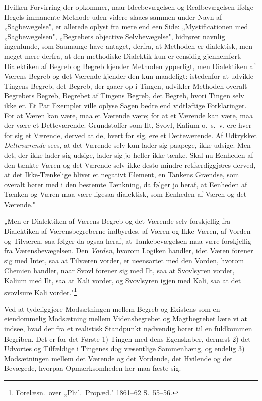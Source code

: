 \documentclass[12pt]{book}
\newcommand{\opage}[1]{\marginnote{\footnotesize\textit{[#1]}}}
\begin{document}
Hvilken Forvirring der opkommer, naar Ideebevægelsen og Realbevægelsen ifølge Hegels immanente
Methode uden videre slaaes sammen under Navn af „Sagbevægelse", er allerede oplyst fra mere end
een Side: „Mystificationen med „Sagbevægelsen", „Begrebets objective Selvbevægelse", hidrører
navnlig ingenlunde, som Saamange have antaget, derfra, at Methoden er dialektisk, men meget mere
derfra, at den methodiske Dialektik kun er eensidig gjennemført. Dialektiken af Begreb og Begreb
kjender Methoden ypperligt, men Dialektiken af Værens Begreb og det Værende kjender den kun
maadeligt: istedenfor at udvikle Tingens Begreb, det Begreb, der gaaer op i Tingen, udvikler
Methoden overalt Begrebets Begreb, Begrebet af Tingens Begreb, det Begreb, hvori Tingen selv ikke
er. Et Par Exempler ville oplyse Sagen bedre end vidtløftige Forklaringer. For at Væren kan være,
maa et Værende være; for at et Værende kan være, maa der være et Detteværende. Grundstoffer som
Ilt, Svovl, Kalium o.\ s.\ v. ere hver for sig et Værende, derved at de, hvert for sig, ere et
Detteværende. Af Udtrykket \emph{Detteværende} sees, at det Værende selv kun lader sig paapege,
ikke udsige. Men det, der ikke lader sig udsige, lader sig jo heller ikke tænke. Skal nu Eenheden
af den tænkte Væren og det Værende selv
\opage{201} ikke desto mindre retfærdiggjøres derved, at det Ikke-Tænkelige bliver et negativt Element, en
Tankens Grændse, som overalt hører med i den bestemte Tænkning, da følger jo heraf, at Eenheden af
Tænken og Væren maa være ligesaa dialektisk, som Eenheden af Væren og det Værende."

„Men er Dialektiken af Værens Begreb og det Værende selv forskjellig fra Dialektiken af
Værensbegreberne indbyrdes, af Væren og Ikke-Væren, af Vorden og Tilværen, saa følger da ogsaa
heraf, at Tankebevægelsen maa være forskjellig fra Værensbevægelsen. Den \emph{Vorden}, hvorom
Logiken handler, idet Væren forener sig med Intet, saa at Tilværen vorder, er ueensartet med den
Vorden, hvorom Chemien handler, naar Svovl forener sig med Ilt, saa at Svovlsyren vorder, Kalium
med Ilt, saa at Kali vorder, og Svovlsyren igjen med Kali, saa at det svovlsure Kali
vorder."\footnote{Forelæsn.\ over „Phil.\ Propæd." 1861--62 S.~55--56.}

Ved at tydeliggjøre Modsætningen mellem Begreb og Existens som en eiendommelig Modsætning mellem
Vidensbegrebet og Magtbegrebet lære vi at indsee, hvad der fra et realistisk Standpunkt nødvendig
hører til en fuldkommen Begriben. Det er for det Første 1) Tingen med dens Egenskaber, dernæst 2)
det Udvortes og Tilfældige i Tingenes dog væsentlige Sammenhæng, og endelig 3) Modsætningen mellem
det Værende og det Vordende, det Hvilende og det Bevægede, hvorpaa Opmærksomheden her maa fæste sig.
\end{document}
